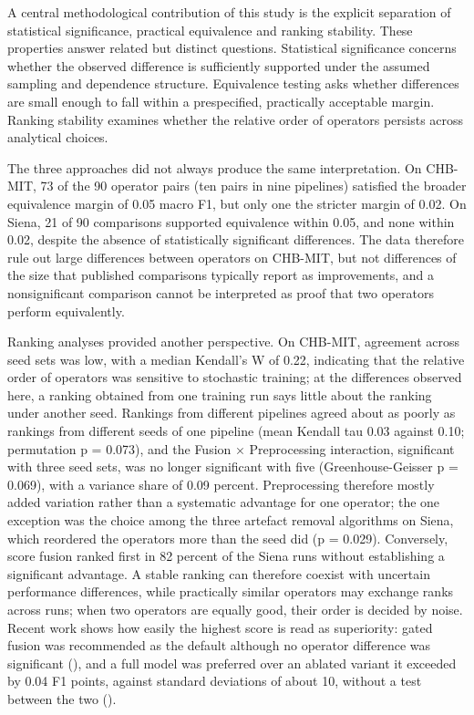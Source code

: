 \documentclass[11pt,a4paper]{article}
\newcounter{none} %
\begin{document}
A central methodological contribution of this study is the explicit separation of
statistical significance, practical equivalence and ranking stability. These properties
answer related but distinct questions. Statistical significance concerns whether the
observed difference is sufficiently supported under the assumed sampling and dependence
structure. Equivalence testing asks whether differences are small enough to fall within a
prespecified, practically acceptable margin. Ranking stability examines whether the
relative order of operators persists across analytical choices.

The three approaches did not always produce the same interpretation. On CHB-MIT, 73 of
the 90 operator pairs (ten pairs in nine pipelines) satisfied the broader equivalence
margin of 0.05 macro F1, but only one the stricter margin of 0.02. On Siena, 21 of 90
comparisons supported equivalence within 0.05, and none within 0.02, despite the absence
of statistically significant differences. The data therefore rule out large differences
between operators on CHB-MIT, but not differences of the size that published comparisons
typically report as improvements, and a nonsignificant comparison cannot be interpreted
as proof that two operators perform equivalently.

Ranking analyses provided another perspective. On CHB-MIT, agreement across seed sets was
low, with a median Kendall's W of 0.22, indicating that the relative order of operators
was sensitive to stochastic training; at the differences observed here, a ranking obtained from one training run says little about the ranking under another seed. Rankings from different pipelines
agreed about as poorly as rankings from different seeds of one pipeline (mean Kendall
tau 0.03 against 0.10; permutation p = 0.073), and the Fusion × Preprocessing interaction, significant with three seed sets,
was no longer significant with five (Greenhouse-Geisser p = 0.069), with a variance
share of 0.09 percent. Preprocessing therefore mostly added variation rather than a
systematic advantage for one operator; the one exception was the choice among the three
artefact removal algorithms on Siena, which reordered the operators more than the seed
did (p = 0.029). Conversely, score fusion ranked first in 82 percent of the Siena runs
without establishing a significant advantage. A stable ranking can therefore coexist with
uncertain performance differences, while practically similar operators may exchange
ranks across runs; when two operators are equally good, their order is decided by noise.
Recent work shows how easily the highest score is read as superiority: gated fusion was
recommended as the default although no operator difference was significant
(\citealp{Miantezila_Junior_2026}), and a full model was preferred over an ablated variant it exceeded by
0.04 F1 points, against standard deviations of about 10, without a test between the two
(\citealp{Tiwary_2026}).
\end{document}
